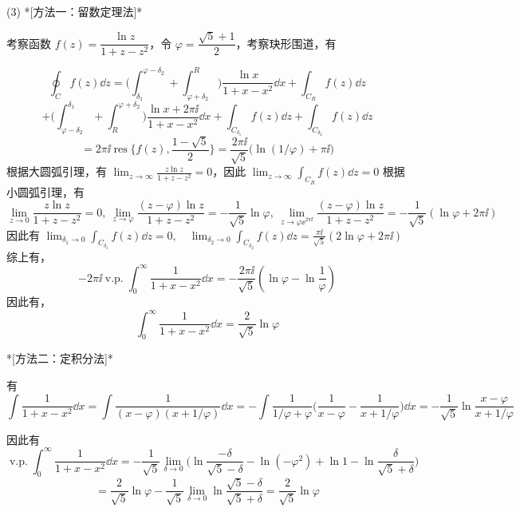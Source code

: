 \begin{question}
\begin{solution}
(3) *[方法一：留数定理法]*

考察函数 \(f(z) = \dfrac{\ln z}{1+z-z^2}\)，令 \(\varphi=\dfrac{\sqrt5+1}{2}\)，考察玦形围道，有
\begin{center}
\end{center}

\[ \oint_C f(z)\dd{z} =\biggl(\int_{\delta_1}^{\varphi-\delta_2}+\int_{\varphi+\delta_2}^{R}\biggr) \frac{\ln x}{1+x-x^2}\dd{x} + \int_{C_R} f(z)\dd{z} \] \[ +\biggl(\int_{\varphi-\delta_2}^{\delta_1}+\int_{R}^{\varphi+\delta_2}\biggr) \frac{\ln x + 2\pi\ii}{1+x-x^2}\dd{x} +\int_{C_{\delta_1}} f(z)\dd{z} + \int_{C_{\delta_2}} f(z)\dd{z} \] \[ = 2\pi\ii \operatorname{res}\biggl\{f(z),\frac{1-\sqrt5}{2}\biggr\}= \frac{2\pi\ii}{\sqrt5} \bigl(\ln (1/\varphi)+\pi\ii\bigr) \]
根据大圆弧引理，有 \(\displaystyle\lim_{z\to\infty} \frac{z\ln z}{1+z-z^2}=0\)，因此 \(\displaystyle \lim_{z\to\infty} \int_{C_R} f(z)\dd{z}= 0\)
根据小圆弧引理，有 \[ \lim_{z\to0} \frac{z\ln z}{1+z-z^2}=0,\ \lim_{z\to\varphi} \frac{(z-\varphi)\ln z}{1+z-z^2}=-\frac1{\sqrt5}\ln\varphi,\ \lim_{z\to\varphi \ee^{2\pi\ii}} \frac{(z-\varphi)\ln z}{1+z-z^2}=-\frac{1}{\sqrt5}(\ln\varphi+2\pi\ii) \]
因此有 \(\displaystyle \lim_{\delta_1\to0} \int_{C_{\delta_1}} f(z)\dd{z}=0,\quad \lim_{\delta_2\to0} \int_{C_{\delta_2}}f(z)\dd{z}=\frac{\pi\ii}{\sqrt5} (2\ln\varphi+2\pi\ii)\)
综上有，\[ -2\pi\ii \operatorname{v.p.}\int_0^\infty \frac{1}{1+x-x^2}\dd{x}=-\frac{2\pi\ii}{\sqrt5} (\ln\varphi -\ln\frac1\varphi) \]
因此有，\[ \int_0^\infty \frac{1}{1+x-x^2}\dd{x} = \frac{2}{\sqrt5} \ln\varphi \]

*[方法二：定积分法]*

有 \[ \int \frac{1}{1+x-x^2}\dd{x}=\int \frac{1}{(x-\varphi)(x+1/\varphi)}\dd{x} =-\int \frac{1}{1/\varphi+\varphi} \biggl(\frac{1}{x-\varphi}-\frac{1}{x+1/\varphi}\biggr)\dd{x}=-\frac{1}{\sqrt5} \ln\frac{x-\varphi}{x+1/\varphi} \]

因此有 \[ \operatorname{v.p.}\int_0^\infty \frac{1}{1+x-x^2}\dd{x} = -\frac1{\sqrt5} \lim_{\delta\to0} \biggl(\ln\frac{-\delta}{\sqrt5-\delta}-\ln(-\varphi^2)+\ln 1-\ln\frac{\delta}{\sqrt5+\delta}\biggr) \] \[ =\frac{2}{\sqrt5}\ln\varphi-\frac1{\sqrt5}\lim_{\delta\to0}\ln\frac{\sqrt5-\delta}{\sqrt5+\delta} =\frac{2}{\sqrt5}\ln\varphi \]
\end{solution}
\end{question}

